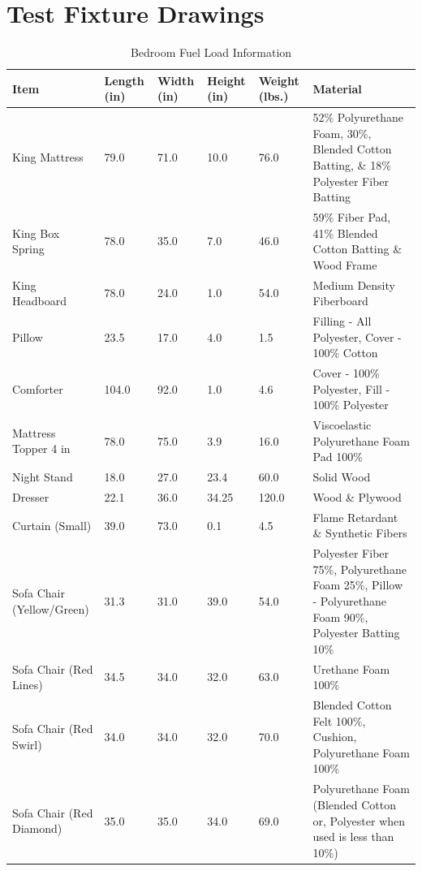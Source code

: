 \clearpage		\large
\chapter{Test Fixture Drawings} \label{App:test_figure_drawings}

\begin{table}[H]
\centering
\begin{tabular}{|L{0.23\textwidth}|C{0.08\textwidth}|C{0.08\textwidth}|C{0.08\textwidth}|C{0.08\textwidth}|L{0.25\textwidth}|}
\hline
Item 								&Length (in) 	&Width (in) 	&Height (in) 	&Weight (lbs.) 	&Material \\ \hline \hline
King Mattress 						&79.0 			&71.0 			&10.0 			&76.0 			&52\% Polyurethane Foam, 30\%, Blended Cotton Batting, \& 18\% Polyester Fiber Batting \\ \hline
King Box Spring 					&78.0 			&35.0 			&7.0			&46.0 			&59\% Fiber Pad, 41\% Blended Cotton Batting \& Wood Frame \\ \hline
King Headboard 						&78.0			&24.0 			&1.0			&54.0 			&Medium Density Fiberboard \\ \hline
Pillow 								&23.5 			&17.0 			&4.0			&1.5 			&Filling - All Polyester, Cover - 100\% Cotton \\ \hline
Comforter 							&104.0 			&92.0 			&1.0			&4.6 			&Cover - 100\% Polyester, Fill - 100\% Polyester \\ \hline
Mattress Topper 4 in 				&78.0 			&75.0 			&3.9 			&16.0  			&Viscoelastic Polyurethane Foam Pad 100\% \\ \hline
Night Stand 						&18.0 			&27.0 			&23.4	 		&60.0 			&Solid Wood \\ \hline
Dresser 							&22.1	 		&36.0 			&34.25 			&120.0 			&Wood \& Plywood \\ \hline
Curtain (Small) 					&39.0 			&73.0 			&0.1 			&4.5 			&Flame Retardant \& Synthetic Fibers \\ \hline
Sofa Chair (Yellow/Green) 			&31.3 			&31.0 			&39.0 			&54.0 			&Polyester Fiber 75\%, Polyurethane Foam 25\%, Pillow - Polyurethane Foam 90\%, Polyester Batting 10\% \\ \hline
Sofa Chair (Red Lines) 				&34.5 			&34.0 			&32.0 			&63.0 			&Urethane Foam 100\% \\ \hline
Sofa Chair (Red Swirl) 				&34.0 			&34.0 			&32.0 			&70.0 			&Blended Cotton Felt 100\%, Cushion, Polyurethane Foam 100\% \\ \hline
Sofa Chair (Red Diamond) 			&35.0 			&35.0 			&34.0 			&69.0 			&Polyurethane Foam (Blended Cotton or, Polyester when used is less than 10\%) \\ \hline
\end{tabular}
\caption{Bedroom Fuel Load Information}
\label{table:bd_fuel_weights}
\end{table}

